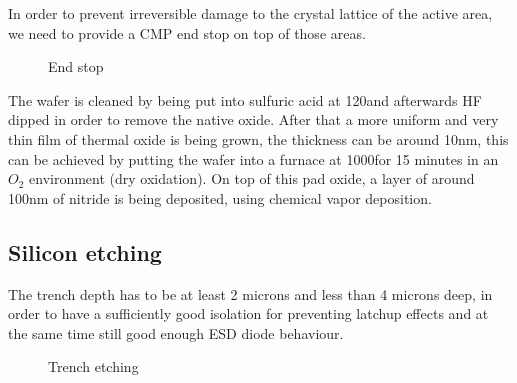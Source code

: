 In order to prevent irreversible damage to the crystal lattice of the active area, we need to provide a CMP end stop on top of those areas.

\begin{figure}[H]
	\centering
	\begin{tikzpicture}[node distance = 3cm, auto, thick,scale=\CrossSectionOnly, every node/.style={transform shape}]
		
	\end{tikzpicture}
	\drawStepArrow{}
	\begin{tikzpicture}[node distance = 3cm, auto, thick,scale=\CrossSectionOnly, every node/.style={transform shape}]
		
	\end{tikzpicture}
	\caption{End stop}
\end{figure}

The wafer is cleaned by being put into sulfuric acid at 120\degreesC and afterwards HF dipped in order to remove the native oxide.
After that a more uniform and very thin film of thermal oxide is being grown, the thickness can be around 10nm, this can be achieved by putting the wafer into a furnace at 1000\degreesC for 15 minutes in an $O_2$ environment (dry oxidation).
On top of this pad oxide, a layer of around 100nm of nitride is being deposited, using chemical vapor deposition.

\subsection{Silicon etching}\label{sti_trench_etch}

The trench depth has to be at least 2 microns and less than 4 microns deep, in order to have a sufficiently good isolation for preventing latchup effects and at the same time still good enough ESD diode behaviour.

\begin{figure}[H]
	\centering
	\begin{tikzpicture}[node distance = 3cm, auto, thick,scale=\CrossSectionOnly, every node/.style={transform shape}]
		
	\end{tikzpicture}
	\drawStepArrow{}
	\begin{tikzpicture}[node distance = 3cm, auto, thick,scale=\CrossSectionOnly, every node/.style={transform shape}]
		
	\end{tikzpicture}
	\caption{Trench etching}
\end{figure}

